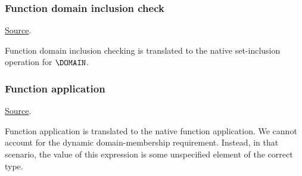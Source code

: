 \subsubsection{ Function domain inclusion check}
\href{https://github.com/saltiniroberto/ssf/blob/7ea6e18093d9da3154b4e396dd435549f687e6b9/high_level/common/pythonic_code_generic.py#L100-L101}{Source}.



\begin{mathpar}
\end{mathpar}
Function domain inclusion checking is translated to the \tlap{} native set-inclusion operation for $\DOMAIN$.

\subsubsection{ Function application}
\href{https://github.com/saltiniroberto/ssf/blob/7ea6e18093d9da3154b4e396dd435549f687e6b9/high_level/common/pythonic_code_generic.py#L104-L106}{Source}.



\begin{mathpar}
\end{mathpar}
Function application is translated to the \tlap{} native function application. We cannot account for the dynamic domain-membership requirement. Instead, in that scenario, the value of this expression is some unspecified element of the correct type.


